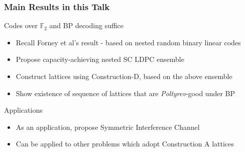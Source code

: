 \documentclass[10pt]{beamer}
\begin{document}
\begin{frame}\frametitle{Main Results in this Talk}
			\begin{block}{Codes over $\mathbb{F}_{2}$ and BP decoding suffice}
				\vspace{1em}
	\begin{itemize}
			\item Recall Forney et al's result - based on nested random binary linear codes
			\item Propose capacity-achieving nested SC LDPC ensemble
			\item Construct lattices using Construction-D, based on the above ensemble
			\item Show existence of sequence of lattices that are \textit{Poltyrev}-good under BP 
	\end{itemize}			
			\end{block}
\pause
\vspace{2em}
		\begin{block}{Applications}
			    \begin{itemize}
        \item As an application, propose {\blue Symmetric Interference Channel}
        \item Can be applied to other problems which adopt Construction A lattices
    			\end{itemize}
		\end{block}
\end{frame}
\end{document}
